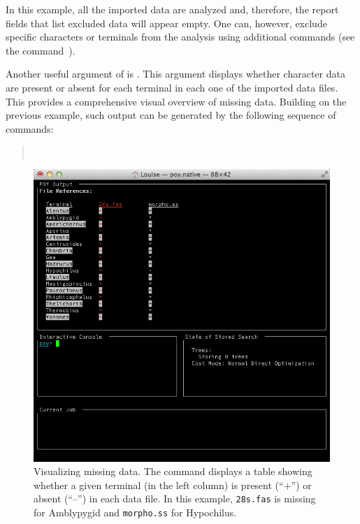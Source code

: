 {In this example, all the imported data are analyzed and, therefore,
the report fields that list excluded data will appear empty.  One
can, however, exclude specific characters or terminals from the
analysis using additional commands (see the command~).

Another useful argument of  is
. This argument displays whether
character data are present or absent for each terminal in each one
of the imported data files. This provides a comprehensive visual
overview of missing data. Building on the previous example, such
output can be generated by the following sequence of commands:
\begin{quote} \\
 \end{quote}

\begin{figure}[]
\begin{center}
\includegraphics[width=1.0\textwidth]{doc/figures/crossref.jpg}
\end{center}
\caption{Visualizing missing data. The command
 displays a table showing whether
a given terminal (in the left column) is present (``+'') or absent
(``--'') in each data file. In this example, \texttt{28s.fas} is
missing for Amblypygid and \texttt{morpho.ss} for Hypochilus.}
\label{fig:crossref} \end{figure}

}
